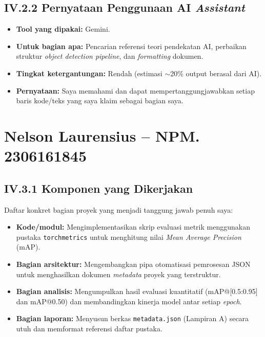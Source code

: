 \documentclass[11pt,a4paper,oneside]{report}
\begin{document}
\subsection*{IV.2.2 Pernyataan Penggunaan AI \textit{Assistant}}
\begin{itemize}[leftmargin=*]
    \item \textbf{Tool yang dipakai:} Gemini.
    \item \textbf{Untuk bagian apa:} Pencarian referensi teori pendekatan AI, perbaikan struktur \textit{object detection pipeline}, dan \textit{formatting} dokumen.
    \item \textbf{Tingkat ketergantungan:} Rendah (estimasi $\sim$20\% output berasal dari AI).
    \item \textbf{Pernyataan:} Saya memahami dan dapat mempertanggungjawabkan setiap baris kode/teks yang saya klaim sebagai bagian saya.
\end{itemize}

\section{Nelson Laurensius -- NPM. 2306161845}

\subsection*{IV.3.1 Komponen yang Dikerjakan}
Daftar konkret bagian proyek yang menjadi tanggung jawab penuh saya:
\begin{itemize}[leftmargin=*]
    \item \textbf{Kode/modul:} Mengimplementasikan skrip evaluasi metrik menggunakan pustaka \texttt{torchmetrics} untuk menghitung nilai \textit{Mean Average Precision} (mAP).
    \item \textbf{Bagian arsitektur:} Mengembangkan pipa otomatisasi pemrosesan JSON untuk menghasilkan dokumen \textit{metadata} proyek yang terstruktur.
    \item \textbf{Bagian analisis:} Mengumpulkan hasil evaluasi kuantitatif (mAP@[0.5:0.95] dan mAP@0.50) dan membandingkan kinerja model antar setiap \textit{epoch}.
    \item \textbf{Bagian laporan:} Menyusun berkas \texttt{metadata.json} (Lampiran A) secara utuh dan memformat referensi daftar pustaka.
\end{itemize}
\end{document}
